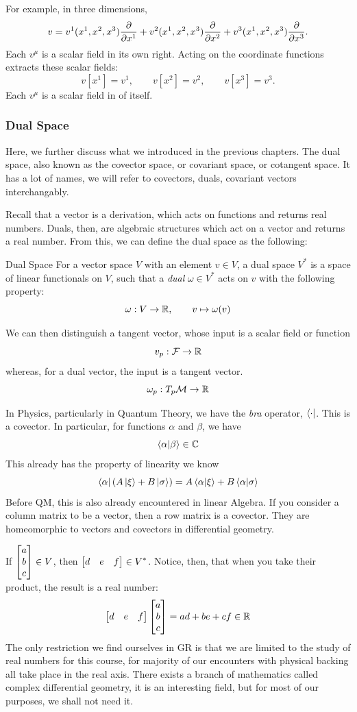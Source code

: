 	For example, in three dimensions,
	\[
		v =
		v^1(x^1,x^2,x^3)\pdv{}{x^1}
		+
		v^2(x^1,x^2,x^3)\pdv{}{x^2}
		+
		v^3(x^1,x^2,x^3)\pdv{}{x^3}.
	\]
	Each $v^\mu$ is a scalar field in its own right. Acting on the
	coordinate functions extracts these scalar fields:
	\[
		v[x^1]=v^1,\qquad
		v[x^2]=v^2,\qquad
		v[x^3]=v^3.
	\]
	Each $v^\mu$ is a scalar field in of itself. 

	\subsubsection{Dual Space}

		Here, we further discuss what we introduced in the previous chapters. The dual space, 
		also known as the covector space, or covariant space, or cotangent space. It has a lot of names, we will refer to covectors, duals, covariant vectors interchangably.

		Recall that a vector is a derivation, which acts on functions and returns real numbers.
		Duals, then, are algebraic structures which act on a vector and returns a real number.
		From this, we can define the dual space as the following:

		\begin{definition}{Dual Space}
			For a vector space $V$ with an element $v\in V$, a dual space
			$V^*$ is a space of linear functionals on $V$, such that a \textit{dual} $\omega\in V^*$
			acts on $v$ with the following property:
			\[
				\omega:V \to \mathbb{R},\qquad v\mapsto \omega(v)
			\]
		\end{definition}
		We can then distinguish a tangent vector, whose input is a scalar field or function
		\[
			v_p:\mathcal F \to \mathbb{R}
		\]
		whereas, for a  dual vector, the input is a tangent vector.
		\[
			\omega_p : T_p \mathcal{M} \to \mathbb{R}
		\]

		In Physics, particularly in Quantum Theory, we have the \textit{bra} operator, $\bra{\cdot}$. This 
		is a covector. In particular, for functions $\alpha$ and $\beta$, we have
		\[
			\braket{\alpha}{\beta}\in\mathbb{C}
		\]
		This already has the property of linearity we know
		\[
			\bra{\alpha}\pqty{
				A\ket{\xi} + B\ket{\sigma}
			} = 
			A\braket{\alpha}{\xi} + B \braket{\alpha}{\sigma}
		\]
		Before QM, this is also already encountered in linear Algebra. If you consider
		a column matrix to be a vector, then a row matrix is a covector. They are homeomorphic
		to vectors and covectors in differential geometry.

		If $\displaystyle \bmqty{a\\b\\c}\in V$, then $\displaystyle \bmqty{
		d & e & f}\in V^*$. Notice, then, that when you take their product, the result
		is a real number:
		\[
			\bmqty{
				d&e&f
			} 
			\bmqty{
				a\\b\\c
			} 
			=
			ad + be + cf \in \R
		\]
		The only restriction we find ourselves in GR is that we are limited
		to the study of real numbers for this course, for majority of our encounters
		with physical backing all take place in the real axis. There exists a branch of mathematics 
		called complex differential geometry, it is an interesting field, but for most of our purposes, we shall
		not need it.

